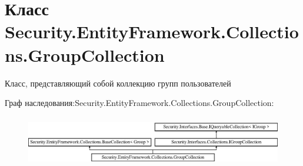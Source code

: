 \hypertarget{class_security_1_1_entity_framework_1_1_collections_1_1_group_collection}{}\section{Класс Security.\+Entity\+Framework.\+Collections.\+Group\+Collection}
\label{class_security_1_1_entity_framework_1_1_collections_1_1_group_collection}


Класс, представляющий собой коллекцию групп пользователей  


Граф наследования\+:Security.\+Entity\+Framework.\+Collections.\+Group\+Collection\+:\begin{figure}[H]
\begin{center}
\leavevmode
\includegraphics[height=2.222222cm]{d7/d04/class_security_1_1_entity_framework_1_1_collections_1_1_group_collection}
\end{center}
\end{figure}
